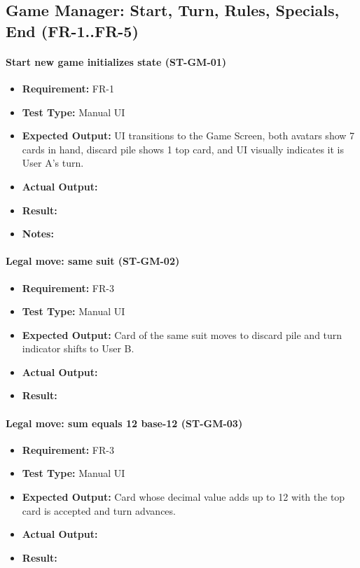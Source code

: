 \documentclass[12pt, titlepage]{article}
\begin{document}
\subsection{Game Manager: Start, Turn, Rules, Specials, End (FR-1..FR-5)}

\paragraph{Start new game initializes state (ST-GM-01)}
\begin{itemize}
  \item \textbf{Requirement:} FR-1
  \item \textbf{Test Type:} Manual UI
  \item \textbf{Expected Output:} UI transitions to the Game Screen, both avatars show 7 cards in hand, discard pile shows 1 top card, and UI visually indicates it is User A's turn.
  \item \textbf{Actual Output:} 
  \item \textbf{Result:} 
  \item \textbf{Notes:} 
\end{itemize}

\paragraph{Legal move: same suit (ST-GM-02)}
\begin{itemize}
  \item \textbf{Requirement:} FR-3
  \item \textbf{Test Type:} Manual UI
  \item \textbf{Expected Output:} Card of the same suit moves to discard pile and turn indicator shifts to User B.
  \item \textbf{Actual Output:} 
  \item \textbf{Result:} 
\end{itemize}

\paragraph{Legal move: sum equals 12 base-12 (ST-GM-03)}
\begin{itemize}
  \item \textbf{Requirement:} FR-3
  \item \textbf{Test Type:} Manual UI
  \item \textbf{Expected Output:} Card whose decimal value adds up to 12 with the top card is accepted and turn advances.
  \item \textbf{Actual Output:} 
  \item \textbf{Result:} 
\end{itemize}
\end{document}
